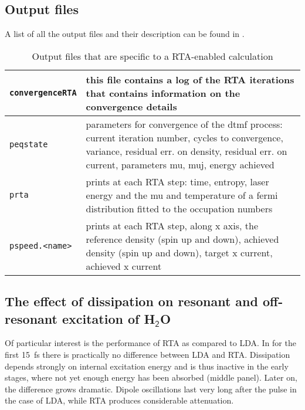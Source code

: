 \documentclass[11pt,a4paper]{article}
\begin{document}
		\subsection{Output files}
			A list of all the output files and their description can be found in .
			
			\begin{table}[!htbp]
				\caption{Output files that are specific to a RTA-enabled calculation}\label{tab:dynamic-output-files-rta}
				\begin{tabular}{|p{4.5cm}|p{10.2cm}|}
					\hline
					\texttt{convergenceRTA} & this file contains a log of the RTA iterations that contains information on the convergence details\\
					\hline
					\texttt{peqstate} &  parameters for convergence of the dtmf process: current iteration number, cycles to convergence, variance, residual err. on density, residual err. on current, parameters mu, muj, energy achieved\\
					\hline
					\texttt{prta} & prints at each RTA  step: time, entropy, laser energy and the mu and temperature of a fermi distribution fitted to the occupation numbers\\
					\hline
					\texttt{pspeed.<name>} & prints at each RTA step, along x axis, the reference density (spin up and down), achieved density (spin up and down), target x current, achieved x current \\
					\hline
				\end{tabular}
			\end{table}
			
		\subsection{The effect of dissipation on resonant and off-resonant excitation of H$_\mathsf{2}$O}
			Of particular interest is the performance of RTA as compared to LDA. In  for the first 15~fs there is practically no difference between LDA and RTA. Dissipation depends strongly on internal excitation energy and is thus inactive in the early stages, where not yet enough energy has been absorbed (middle panel). Later on, the difference grows dramatic. Dipole oscillations last very long after the pulse in the case of LDA, while RTA produces considerable attenuation.
			
\end{document}

